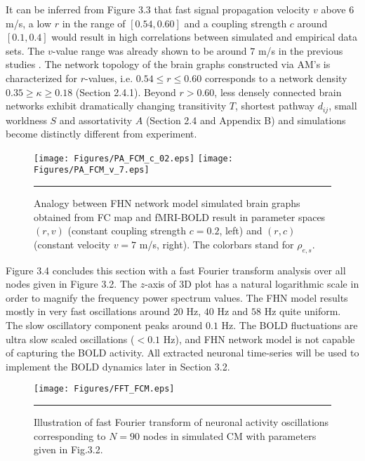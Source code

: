 It can be inferred from Figure 3.3 that fast signal propagation velocity $v$ above $6$ m/s, a low $r$ in the range of  $[0.54, 0.60]$ and a coupling strength $c$ around $[0.1, 0.4]$ would result in high correlations between simulated and empirical data sets. The $v$-value range was already shown to be around $7$ m/s in the previous studies \citep{VUK13, GHO08a}. The network topology of the brain graphs constructed via AM's is characterized for $r$-values, i.e. $0.54 \leq r \leq 0.60$ corresponds to a network density $  0.35 \geq  \kappa \geq 0.18 $ (Section 2.4.1). Beyond $r > 0.60$, less densely connected brain networks exhibit dramatically changing transitivity $T$, shortest pathway $d_{ij}$, small worldness $S$ and assortativity $A$ (Section 2.4 and Appendix B) and simulations become distinctly different from experiment.  


\begin{figure}[htbp]
 
  \centering
    \texttt{[image: Figures/PA\_FCM\_c\_02.eps]} 
	\texttt{[image: Figures/PA\_FCM\_v\_7.eps]} 

	
    \rule{35em}{0.5pt}
  \caption[Parameter Analysis, FCM]{Analogy between FHN network model simulated brain graphs obtained from FC map and fMRI-BOLD result in parameter spaces $(r,v)$ (constant coupling strength $c=0.2$, left) and $(r,c)$ (constant velocity $v=7$ m/s, right). The colorbars stand for $\rho_{e,s}$.  }
  \label{fig:Parameter Analysis, FCM}
 	
\end{figure}  


Figure 3.4 concludes this section with a fast Fourier transform analysis over all nodes given in Figure 3.2. The $z$-axis of 3D plot has a natural logarithmic scale in order to magnify the frequency power spectrum values. The FHN model results mostly in very fast oscillations around  $20$ Hz, $40$ Hz and $58$ Hz quite uniform. The slow oscillatory component peaks around $0.1$ Hz. The BOLD fluctuations are ultra slow scaled oscillations ($<0.1$ Hz), and FHN network model is not capable of capturing the BOLD activity. All extracted neuronal time-series will be used to implement the BOLD dynamics later in Section 3.2.


\begin{figure}[htbp]
 
  \centering
	 \texttt{[image: Figures/FFT\_FCM.eps]} 

    \rule{35em}{0.5pt}
  \caption[3D Fast Fourier Transform, FHN, FCM]{Illustration of fast Fourier transform of neuronal activity oscillations corresponding to $N=90$ nodes in simulated CM with parameters given in Fig.3.2.} 
    \label{fig:3D Fast Fourier Transform, FHN, FCM}
 	
\end{figure}  

